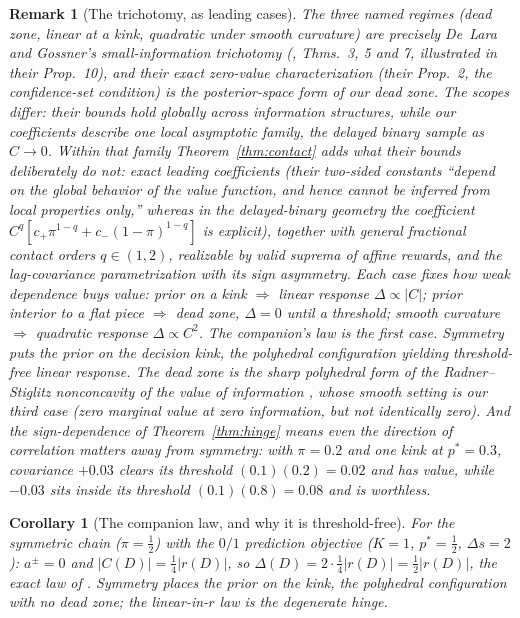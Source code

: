 \documentclass[11pt]{article}
\newtheorem{corollary}[theorem]{Corollary}
\newtheorem{remark}[theorem]{Remark}
\begin{document}
\begin{remark}[The trichotomy, as leading cases]\label{rem:trichotomy}
The three named regimes (dead zone, linear at a kink, quadratic under
smooth curvature) are precisely De~Lara and Gossner's small-information
trichotomy (\cite{delaragossner}, Thms.~3, 5 and 7, illustrated in their
Prop.~10), and their exact zero-value
characterization (their Prop.~2, the confidence-set condition) is the
posterior-space form of our dead zone. The scopes differ: their bounds hold
globally across information structures, while our coefficients describe
one local asymptotic family, the delayed binary sample as $C\to0$. Within
that family Theorem~\ref{thm:contact} adds
what their bounds deliberately do not: \emph{exact leading coefficients}
(their two-sided constants ``depend on the global behavior of the
value function, and hence cannot be inferred from local properties only,''
whereas in the delayed-binary geometry the coefficient
$C^q[c_+\pi^{1-q}+c_-(1-\pi)^{1-q}]$ is explicit), together with
general fractional contact orders $q\in(1,2)$, realizable by valid
suprema of affine rewards, and the lag-covariance parametrization with
its sign asymmetry. Each case fixes how weak
dependence buys value: \emph{prior on a kink}
$\Rightarrow$ linear response $\Delta\propto|C|$; \emph{prior interior to a
flat piece} $\Rightarrow$ dead zone, $\Delta=0$ until a threshold;
\emph{smooth curvature} $\Rightarrow$ quadratic response
$\Delta\propto C^2$. The companion's law is the first case. Symmetry
puts the prior on the decision kink, the polyhedral configuration
yielding threshold-free linear response. The dead zone is the sharp polyhedral form of the
Radner--Stiglitz nonconcavity of the value of information
\cite{radnerstiglitz84,chadeschlee02}, whose smooth setting is our third case (zero
marginal value at zero information, but not identically zero). And the
sign-dependence of Theorem~\ref{thm:hinge} means even the \emph{direction}
of correlation matters away from symmetry: with $\pi=0.2$ and one kink at
$p^*=0.3$, covariance $+0.03$ clears its threshold $(0.1)(0.2)=0.02$ and
has value, while $-0.03$ sits inside its threshold $(0.1)(0.8)=0.08$ and is
worthless.
\end{remark}

\begin{corollary}[The companion law, and why it is threshold-free]
For the symmetric chain ($\pi=\tfrac12$) with the $0/1$ prediction
objective ($K{=}1$, $p^*=\tfrac12$, $\Delta s=2$):
$a^{\pm}=0$ and $|C(D)|=\tfrac14 |r(D)|$, so
$\Delta(D)=2\cdot\tfrac14 |r(D)|=\tfrac12 |r(D)|$, the exact law of
\cite{infocom}. Symmetry places the prior \emph{on} the kink, the polyhedral
configuration with no dead zone; the linear-in-$r$ law is the degenerate
hinge.
\end{corollary}
\end{document}
